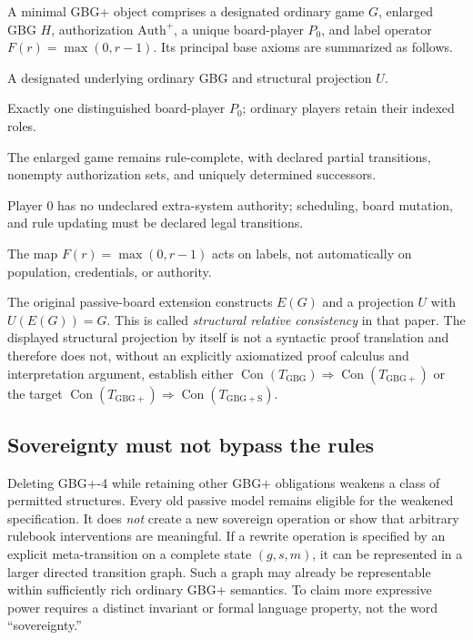 \documentclass[11pt,letterpaper]{article}
\theoremstyle{definition}\newtheorem{definition}[theorem]{Definition}\newtheorem{example}[theorem]{Example}
\theoremstyle{remark}\newtheorem{remark}[theorem]{Remark}
\newcommand{\Con}{\operatorname{Con}}
\begin{document}
A minimal GBG+ object comprises a designated ordinary game $G$, enlarged GBG $H$, authorization $\mathrm{Auth}^{+}$, a unique board-player $P_0$, and label operator $F(r)=\max(0,r-1)$. Its principal base axioms are summarized as follows.
\begin{description}[style=nextline,leftmargin=0pt,itemsep=3pt]
\item[GBG+-1:] A designated underlying ordinary GBG and structural projection $U$.
\item[GBG+-2:] Exactly one distinguished board-player $P_0$; ordinary players retain their indexed roles.
\item[GBG+-3:] The enlarged game remains rule-complete, with declared partial transitions, nonempty authorization sets, and uniquely determined successors.
\item[GBG+-4:] Player 0 has no undeclared extra-system authority; scheduling, board mutation, and rule updating must be declared legal transitions.
\item[GBG+-5:] The map $F(r)=\max(0,r-1)$ acts on labels, not automatically on population, credentials, or authority.
\end{description}
The original passive-board extension constructs $E(G)$ and a projection $U$ with $U(E(G))=G$. This is called \emph{structural relative consistency} in that paper. The displayed structural projection by itself is not a syntactic proof translation and therefore does not, without an explicitly axiomatized proof calculus and interpretation argument, establish either $\Con(T_{\mathrm{GBG}})\Rightarrow\Con(T_{\mathrm{GBG+}})$ or the target $\Con(T_{\mathrm{GBG+}})\Rightarrow\Con(T_{\mathrm{GBG+S}})$.

\subsection{Sovereignty must not bypass the rules}
Deleting GBG+-4 while retaining other GBG+ obligations weakens a class of permitted structures. Every old passive model remains eligible for the weakened specification. It does \emph{not} create a new sovereign operation or show that arbitrary rulebook interventions are meaningful. If a rewrite operation is specified by an explicit meta-transition on a complete state $(g,s,m)$, it can be represented in a larger directed transition graph. Such a graph may already be representable within sufficiently rich ordinary GBG+ semantics. To claim more expressive power requires a distinct invariant or formal language property, not the word ``sovereignty.''
\end{document}
